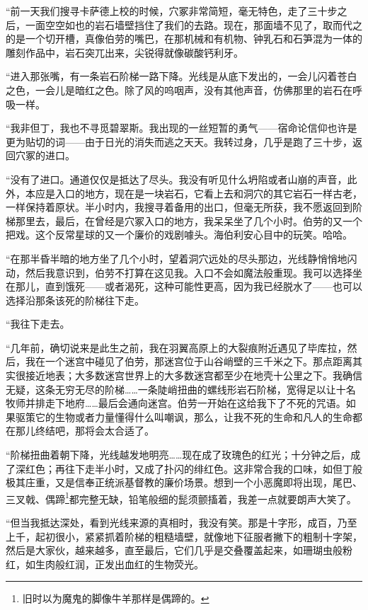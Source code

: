 \documentclass[AutoFakeBold=true]{book}
\begin{document}
``前一天我们搜寻卡萨德上校的时候，穴冢非常简短，毫无特色，走了三十步之后，一面空空如也的岩石墙壁挡住了我们的去路。现在，那面墙不见了，取而代之的是一个切开槽，真像伯劳的嘴巴，在那机械和有机物、钟乳石和石笋混为一体的雕刻作品中，岩石突兀出来，尖锐得就像碳酸钙利牙。

``进入那张嘴，有一条岩石阶梯一路下降。光线是从底下发出的，一会儿闪着苍白之色，一会儿是暗红之色。除了风的呜咽声，没有其他声音，仿佛那里的岩石在呼吸一样。

``我非但丁，我也不寻觅碧翠斯。我出现的一丝短暂的勇气——宿命论信仰也许是更为贴切的词——由于日光的消失而逃之天天。我转过身，几乎是跑了三十步，返回穴冢的进口。

``没有了进口。通道仅仅是抵达了尽头。我没有听见什么坍陷或者山崩的声音，此外，本应是入口的地方，现在是一块岩石，它看上去和洞穴的其它岩石一样古老，一样保持着原状。半小时内，我搜寻着备用的出口，但毫无所获，我不愿返回到阶梯那里去，最后，在曾经是穴冢入口的地方，我呆呆坐了几个小时。伯劳的又一个把戏。这个反常星球的又一个廉价的戏剧噱头。海伯利安心目中的玩笑。哈哈。

``在那半昏半暗的地方坐了几个小时，望着洞穴远处的尽头那边，光线静悄悄地闪动，然后我意识到，伯劳不打算在这见我。入口不会如魔法般重现。我可以选择坐在那儿，直到饿死——或者渴死，这种可能性更高，因为我已经脱水了——也可以选择沿那条该死的阶梯往下走。

``我往下走去。

``几年前，确切说来是此生之前，我在羽翼高原上的大裂痕附近遇见了毕库拉，然后，我在一个迷宫中碰见了伯劳，那迷宫位于山谷峭壁的三千米之下。那点距离其实很接近地表；大多数迷宫世界上的大多数迷宫都至少在地壳十公里之下。我确信无疑，这条无穷无尽的阶梯……一条陡峭扭曲的螺线形岩石阶梯，宽得足以让十名牧师并排走下地府……最后会通向迷宫。伯劳一开始在这给我下了不死的咒语。如果驱策它的生物或者力量懂得什么叫嘲讽，那么，让我不死的生命和凡人的生命都在那儿终结吧，那将会太合适了。

``阶梯扭曲着朝下降，光线越发地明亮……现在成了玫瑰色的红光；十分钟之后，成了深红色；再往下走半小时，又成了扑闪的绯红色。这非常合我的口味，如但丁般极其庄重，又是信奉正统派基督教的廉价场景。想到一个小恶魔即将出现，尾巴、三叉戟、偶蹄\footnote{旧时以为魔鬼的脚像牛羊那样是偶蹄的。}都完整无缺，铅笔般细的髭须颤搐着，我差一点就要朗声大笑了。

``但当我抵达深处，看到光线来源的真相时，我没有笑。那是十字形，成百，乃至上千，起初很小，紧紧抓着阶梯的粗糙墙壁，就像地下征服者撇下的粗制十字架，然后是大家伙，越来越多，直至最后，它们几乎是交叠覆盖起来，如珊瑚虫般粉红，如生肉般红润，正发出血红的生物荧光。
\end{document}
